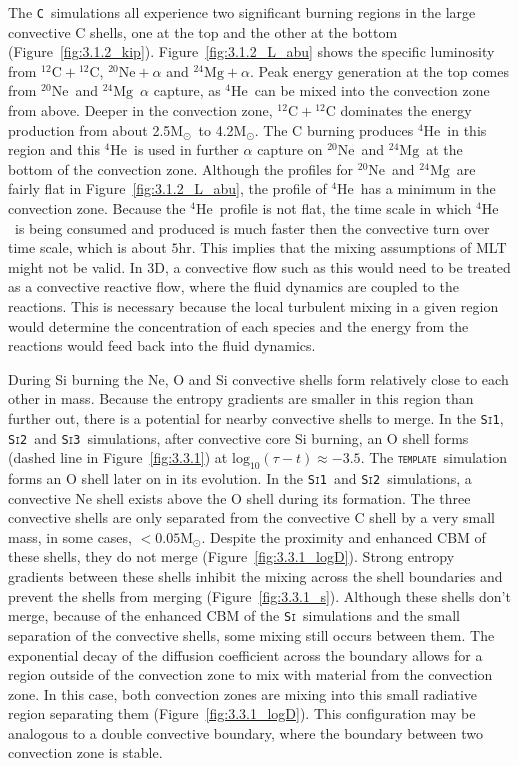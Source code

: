 \documentclass[useAMS,usenatbib]{mn2e}
\newcommand{\Msun}{\ensuremath{\mathrm{M}_\odot}}
\newcommand{\template}{\textsc{\texttt{template}}}
\newcommand{\Sia}{\textsc{\texttt{Si1}}}
\newcommand{\Sib}{\textsc{\texttt{Si2}}}
\newcommand{\Sic}{\textsc{\texttt{Si3}}}
\newcommand{\C}{\textsc{\texttt{C}}}
\newcommand{\Si}{\textsc{\texttt{Si}}}
\newcommand{\nuclei}[2]{\ensuremath{\mathrm{^{#1}#2}}}
\newcommand{\helium}[1][4]{\nuclei{#1}{He}}
\newcommand{\carbon}[1][12]{\nuclei{#1}{C}}
\newcommand{\neon}[1][20]{\nuclei{#1}{Ne}}
\newcommand{\magnesium}[1][24]{\nuclei{#1}{Mg}}
\begin{document}
The \C\ simulations all experience two significant burning regions in the
large convective C shells, one at the top and the other at the bottom
(Figure~\ref{fig:3.1.2_kip}). Figure~\ref{fig:3.1.2_L_abu} shows the specific
luminosity from $\carbon+\carbon$, $\neon + \alpha$ and $\magnesium + \alpha$.
Peak energy generation at the top comes from \neon\ and \magnesium\ $\alpha$
capture, as \helium\ can be mixed into the convection zone from above. Deeper
in the convection zone, $\carbon+\carbon$ dominates the energy production from
about 2.5\Msun\ to 4.2\Msun. The C burning produces \helium\ in this
region and this \helium\ is used in further $\alpha$ capture on \neon\ and
\magnesium\ at the bottom of the convection zone. Although the profiles for
\neon\ and \magnesium\ are fairly flat in Figure~\ref{fig:3.1.2_L_abu}, the
profile of \helium\ has a minimum in the convection zone. Because the
\helium\ profile is not flat, the time scale in which \helium\ is being consumed 
and produced is much faster then the convective turn over time scale,
which is about $5 \mathrm{hr}$. This implies that the mixing assumptions 
of MLT might not be valid. In 3D, a convective flow such as this would 
need to be treated as a convective reactive flow, where the fluid dynamics 
are coupled to the reactions. This is necessary because the local turbulent 
mixing in a given region would determine the concentration of each 
species and the energy from the reactions would feed back into the 
fluid dynamics.

During Si burning the Ne, O and Si convective shells form relatively close to
each other in mass. Because the entropy gradients are smaller in this region
than further out, there is a potential for nearby convective shells to merge.
In the \Sia, \Sib\ and \Sic\ simulations, after convective core Si burning,
an O shell forms (dashed line in Figure~\ref{fig:3.3.1}) at 
$\mathrm{log}_{10}(\tau - t) \approx -3.5$. The \template\ simulation forms 
an O shell later on in its evolution. In the \Sia\ and \Sib\ simulations, a 
convective Ne shell exists above the O shell during its formation. The three 
convective shells are only separated from the convective C shell by a very 
small mass, in some cases, $< 0.05\mathrm{M}_{\odot}$. Despite the 
proximity and enhanced CBM of these shells, they do not merge 
(Figure~\ref{fig:3.3.1_logD}). Strong entropy gradients between these 
shells inhibit the mixing across the shell boundaries and prevent
the shells from merging (Figure~\ref{fig:3.3.1_s}). Although these shells don't
merge, because of the enhanced CBM of the \Si\ simulations and the small
separation of the convective shells, some mixing still occurs between them. The
exponential decay of the diffusion coefficient across the boundary allows for a
region outside of the convection zone to mix with material from the convection
zone. In this case, both convection zones are mixing into this small radiative
region separating them (Figure~\ref{fig:3.3.1_logD}). This configuration may 
be analogous to a double convective boundary, where the boundary between 
two convection zone is stable.
\end{document}
